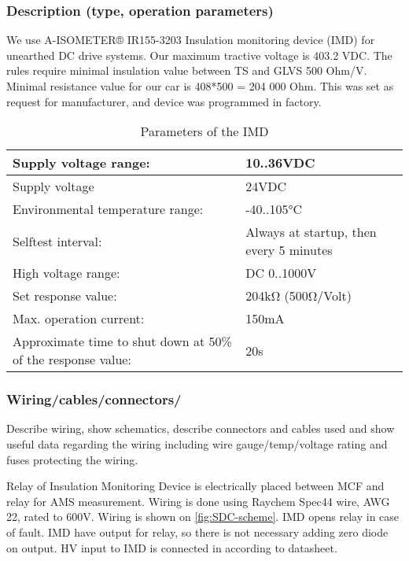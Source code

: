 \subsubsection{Description (type, operation parameters)}
\iffalse Describe the IMD used and use a table for the common operation parameters, like supply voltage, set point, etc. Also, describe how the IMD indicator light is wired, etc.
Additionally, fill out the following table replacing the values with your specification:\fi

We use A-ISOMETER® IR155-3203 Insulation monitoring device (IMD) for unearthed DC drive systems. Our maximum tractive voltage is 403.2 VDC. The rules require minimal insulation value between TS and GLVS 500 Ohm/V. Minimal resistance value for our car is 408*500 = 204 000 Ohm. This was set as request for manufacturer, and device was programmed in factory.
\begin{table}[H]
	\centering
	\caption{Parameters of the IMD}
	\begin{tabu}{|X|l|}
	 \hline	Supply voltage range: & 10..36VDC \\
	 \hline	Supply voltage & 24VDC \\
	 \hline	Environmental temperature range: & -40..105°C \\
	 \hline	Selftest interval: & Always at startup, then every 5 minutes \\
	 \hline	High voltage range: & DC 0..1000V \\
	 \hline	Set response value: & 204kΩ (500Ω/Volt) \\
	 \hline	Max. operation current: & 150mA \\
	 \hline	Approximate time to shut down at 50\% of the response value: & 20s \\
	  \hline
	\end{tabu}%
	\label{tab:IMD}%
\end{table}%

\subsubsection{Wiring/cables/connectors/}
 Describe wiring, show schematics, describe connectors and cables used and show useful data regarding the wiring including wire gauge/temp/voltage rating and fuses protecting the wiring. 

Relay of Insulation Monitoring Device is electrically placed between MCF and relay for AMS measurement. Wiring is done using Raychem Spec44 wire, AWG 22, rated to 600V. Wiring is shown on \ref{fig:SDC-scheme}. IMD opens relay in case of fault. IMD have output for relay, so there is not necessary adding zero diode on output. HV input to IMD is connected in according to datasheet.

